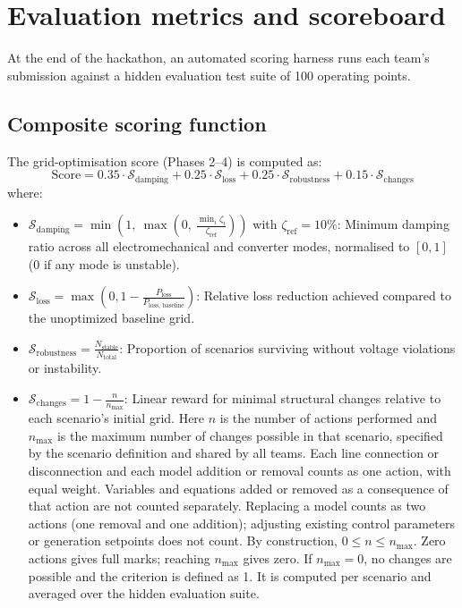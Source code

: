 \documentclass[11pt,a4paper]{article}
\begin{document}
\section{Evaluation metrics and scoreboard}

At the end of the hackathon, an automated scoring harness runs each team's submission against a hidden evaluation test suite of 100 operating points.

\subsection{Composite scoring function}
The grid-optimisation score (Phases 2--4) is computed as:
\begin{equation}
  \text{Score} = 0.35 \cdot \mathcal{S}_{\text{damping}} + 0.25 \cdot \mathcal{S}_{\text{loss}} + 0.25 \cdot \mathcal{S}_{\text{robustness}} + 0.15 \cdot \mathcal{S}_{\text{changes}}
\end{equation}
where:
\begin{itemize}[leftmargin=*, itemsep=2pt]
  \item $\mathcal{S}_{\text{damping}} = \min\!\left(1,\ \max\!\left(0,\ \frac{\min_{i} \zeta_i}{\zeta_{\text{ref}}}\right)\right)$ with $\zeta_{\text{ref}} = 10\%$: Minimum damping ratio across all electromechanical and converter modes, normalised to $[0,1]$ (0 if any mode is unstable).
  \item $\mathcal{S}_{\text{loss}} = \max\left(0, 1 - \frac{P_{\text{loss}}}{P_{\text{loss, baseline}}}\right)$: Relative loss reduction achieved compared to the unoptimized baseline grid.
  \item $\mathcal{S}_{\text{robustness}} = \frac{N_{\text{stable}}}{N_{\text{total}}}$: Proportion of scenarios surviving without voltage violations or instability.
  \item $\mathcal{S}_{\text{changes}} = 1 - \frac{n}{n_{\max}}$: Linear reward for minimal structural changes relative to each scenario's initial grid. Here $n$ is the number of actions performed and $n_{\max}$ is the maximum number of changes possible in that scenario, specified by the scenario definition and shared by all teams. Each line connection or disconnection and each model addition or removal counts as one action, with equal weight. Variables and equations added or removed as a consequence of that action are not counted separately. Replacing a model counts as two actions (one removal and one addition); adjusting existing control parameters or generation setpoints does not count. By construction, $0 \le n \le n_{\max}$. Zero actions gives full marks; reaching $n_{\max}$ gives zero. If $n_{\max}=0$, no changes are possible and the criterion is defined as 1. It is computed per scenario and averaged over the hidden evaluation suite.
  \end{itemize}
\end{document}
